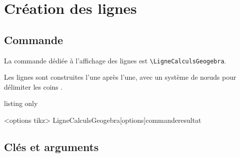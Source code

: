 \documentclass[french,a4paper,11pt]{article}
\begin{document}
\begin{PresentationCode}{}
\begin{CalculFormelGeogebra}
	[CouleurEntete=green!25,PoliceEntete=\LARGE\ttfamily,
	Titre={$\blacktriangleright$ Illustration via GeoGebra},Largeur=13]
\end{CalculFormelGeogebra}
\end{PresentationCode}

\pagebreak

\section{Création des lignes}

\subsection{Commande}

\begin{cautionblock}
La commande dédiée à l'affichage des lignes est \texttt{\textbackslash LigneCalculsGeogebra}.

Les lignes sont construites l'une après l'une, avec un système de nœuds pour délimiter les \og coins \fg.
\end{cautionblock}

\begin{PresentationCode}{listing only}
\begin{CalculFormelGeogebra}<options tikz>
	LigneCalculsGeogebra[options]{commande}{resultat}
\end{CalculFormelGeogebra}
\end{PresentationCode}

\begin{PresentationCode}{}
\begin{CalculFormelGeogebra}
\end{CalculFormelGeogebra}
\end{PresentationCode}

\subsection{Clés et arguments}
\end{document}
